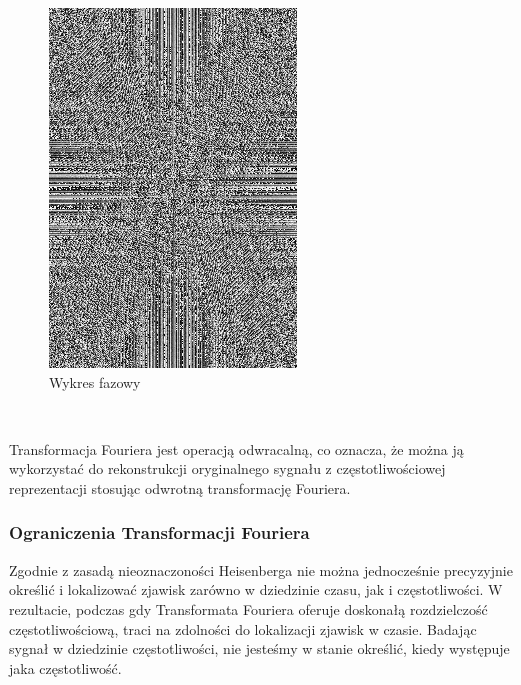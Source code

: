\begin{figure}[ht]
\begin{minipage}[t]{0.325\linewidth}
        \includegraphics[width=\linewidth]{Rozdziały/02.Podstawy_teoretyczne/fft_phase.png}
        \caption{Wykres fazowy}
        \label{fig:image26}
    \end{minipage}
\end{figure}\

Transformacja Fouriera jest operacją odwracalną, co oznacza, że można ją wykorzystać do rekonstrukcji oryginalnego sygnału z częstotliwościowej reprezentacji stosując odwrotną transformację Fouriera.


\subsubsection{Ograniczenia Transformacji Fouriera}

Zgodnie z zasadą nieoznaczoności Heisenberga nie można jednocześnie precyzyjnie określić i lokalizować zjawisk zarówno w dziedzinie czasu, jak i częstotliwości. W rezultacie, podczas gdy Transformata Fouriera oferuje doskonałą rozdzielczość częstotliwościową, traci na zdolności do lokalizacji zjawisk w czasie. Badając sygnał w dziedzinie częstotliwości, nie jesteśmy w stanie określić, kiedy występuje jaka częstotliwość.


